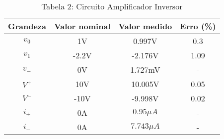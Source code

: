 \vspace{5pt}
\begin{table}[h]
\centering
\begin{tabular}{|c|c|c|c|}
\hline
\textbf{Grandeza} & \textbf{Valor nominal} & \textbf{Valor medido} & \textbf{Erro (\%) }\\\hline
$v_0$ & 1V & 0.997V & 0.3 \\\hline
$v_1$ & -2.2V & -2.176V & 1.09 \\\hline
$v_-$ & 0V & 1.727mV & - \\\hline
$V^+$ & 10V & 10.005V & 0.05 \\\hline
$V^-$ & -10V & -9.998V & 0.02 \\\hline
$i_+$ & 0A & $0.95\mu A$ & - \\\hline
$i_-$ & 0A & $7.743\mu A$ & - \\\hline 
\end{tabular}
\caption*{Tabela 2: Circuito Amplificador Inversor}
\end{table}